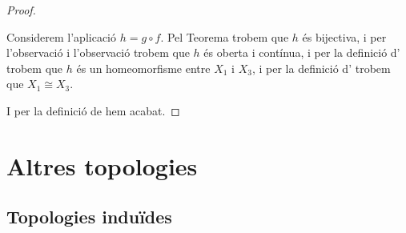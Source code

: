 \documentclass[../Apunts.tex]{subfiles}
\begin{document}
\begin{proposition}
\begin{proof}
\begin{enumerate}
				Considerem l'aplicació \(h=g\circ f\). Pel Teorema  trobem que \(h\) és bijectiva, i per l'observació  i l'observació  trobem que \(h\) és oberta i contínua, i per la definició d' trobem que \(h\) és un homeomorfisme entre \(X_{1}\) i \(X_{3}\), i per la definició d' trobem que \(X_{1}\cong X_{3}\).
			\end{enumerate}
			I per la definició de  hem acabat.
		\end{proof}
	\end{proposition}
\chapter{Altres topologies}
	\section{Topologies induïdes}
\end{document}
